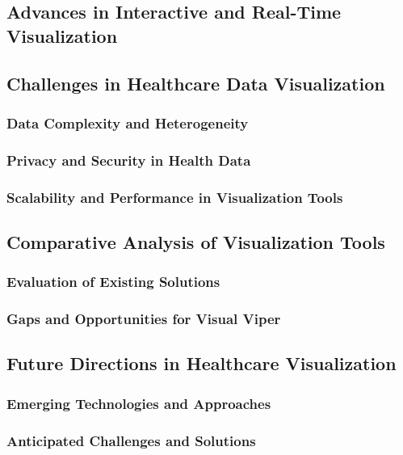 \subsection{Advances in Interactive and Real-Time Visualization}\label{advances-in-interactive-and-real-time-visualization}

\subsection{Challenges in Healthcare Data Visualization}\label{challenges-in-healthcare-data-visualization}


\subsubsection{Data Complexity and Heterogeneity}\label{data-complexity-and-heterogeneity}
\subsubsection{Privacy and Security in Health Data}\label{privacy-and-security-in-health-data}
\subsubsection{Scalability and Performance in Visualization Tools}\label{scalability-and-performance-in-visualization-tools}

\subsection{Comparative Analysis of Visualization Tools}\label{comparative-analysis-of-visualization-tools}
\subsubsection{Evaluation of Existing Solutions}\label{evaluation-of-existing-solutions}
\subsubsection{Gaps and Opportunities for Visual Viper}\label{gaps-and-opportunities-for-visual-viper}

\subsection{Future Directions in Healthcare Visualization}\label{future-directions-in-healthcare-visualization}
\subsubsection{Emerging Technologies and Approaches}\label{emerging-technologies-and-approaches}
\subsubsection{Anticipated Challenges and Solutions}\label{anticipated-challenges-and-solutions}
